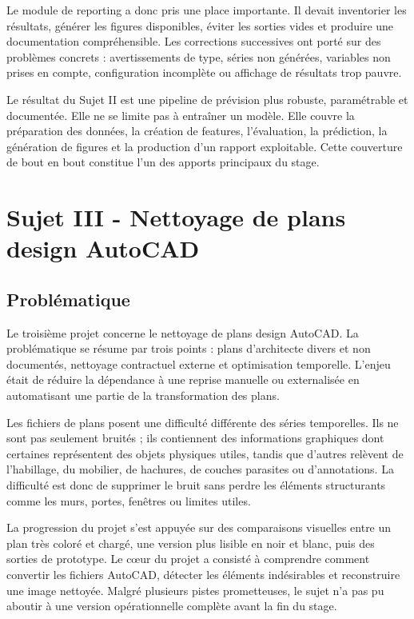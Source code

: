 \documentclass[12pt]{article}
\begin{document}
Le module de reporting a donc pris une place importante. Il devait inventorier les résultats, générer les figures disponibles, éviter les sorties vides et produire une documentation compréhensible. Les corrections successives ont porté sur des problèmes concrets : avertissements de type, séries non générées, variables non prises en compte, configuration incomplète ou affichage de résultats trop pauvre. 

Le résultat du Sujet II est une pipeline de prévision plus robuste, para\-métrable et documentée. Elle ne se limite pas à entraîner un modèle. Elle couvre la préparation des données, la création de features, l’évaluation, la prédiction, la génération de figures et la production d’un rapport exploitable. Cette couverture de bout en bout constitue l’un des apports principaux du stage. 

\newpage
\section{Sujet III - Nettoyage de plans design AutoCAD}

\subsection{Problématique}

Le troisième projet concerne le nettoyage de plans design AutoCAD. La problématique se résume par trois points : plans d’architecte divers et non documentés, nettoyage contractuel externe et optimisation temporelle. L’enjeu était de réduire la dépendance à une reprise manuelle ou externalisée en automatisant une partie de la transformation des plans. 

Les fichiers de plans posent une difficulté différente des séries temporelles. Ils ne sont pas seulement bruités ; ils contiennent des informations graphiques dont certaines représentent des objets physiques utiles, tandis que d’autres relèvent de l’habillage, du mobilier, de hachures, de couches parasites ou d’annotations. La difficulté est donc de supprimer le bruit sans perdre les éléments structurants comme les murs, portes, fenêtres ou limites utiles. 

La progression du projet s’est appuyée sur des comparaisons visuelles entre un plan très coloré et chargé, une version plus lisible en noir et blanc, puis des sorties de prototype. Le cœur du projet a consisté à comprendre comment convertir les fichiers AutoCAD, détecter les éléments indésirables et reconstruire une image nettoyée. Malgré plusieurs pistes prometteuses, le sujet n’a pas pu aboutir à une version opérationnelle complète avant la fin du stage. 
\end{document}
